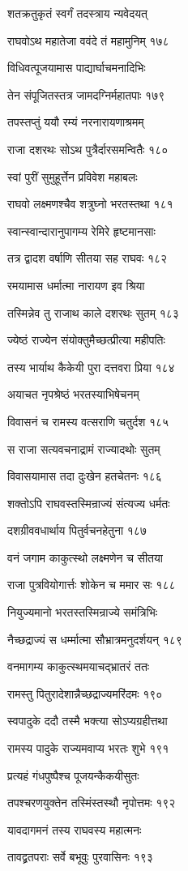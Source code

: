 शतक्रतुकृतं स्वर्गं तदस्त्राय न्यवेदयत्

राघवोऽथ महातेजा ववंदे तं महामुनिम् १७८

विधिवत्पूजयामास पाद्यार्घाचमनादिभिः

तेन संपूजितस्तत्र जामदग्निर्महातपाः १७९

तपस्तप्तुं ययौ रम्यं नरनारायणाश्रमम्

राजा दशरथः सोऽथ पुत्रैर्दारसमन्वितैः १८०

स्वां पुरीं सुमुहूर्त्तेन प्रविवेश महाबलः

राघवो लक्ष्मणश्चैव शत्रुघ्नो भरतस्तथा १८१

स्वान्स्वान्दारानुपागम्य रेमिरे हृष्टमानसाः

तत्र द्वादश वर्षाणि सीतया सह राघवः १८२

रमयामास धर्मात्मा नारायण इव श्रिया

तस्मिन्नेव तु राजाथ काले दशरथः सुतम् १८३

ज्येष्ठं राज्येन संयोक्तुमैच्छत्प्रीत्या महीपतिः

तस्य भार्याथ कैकेयी पुरा दत्तवरा प्रिया १८४

अयाचत नृपश्रेष्ठं भरतस्याभिषेचनम्

विवासनं च रामस्य वत्सराणि चतुर्दश १८५

स राजा सत्यवचनाद्रामं राज्यादथोः सुतम्

विवासयामास तदा दुःखेन हतचेतनः १८६

शक्तोऽपि राघवस्तस्मिन्राज्यं संत्यज्य धर्मतः

दशग्रीववधार्थाय पितुर्वचनहेतुना १८७

वनं जगाम काकुत्स्थो लक्ष्मणेन च सीतया

राजा पुत्रवियोगार्त्तः शोकेन च ममार सः १८८

नियुज्यमानो भरतस्तस्मिन्राज्ये समंत्रिभिः

नैच्छद्राज्यं स धर्म्मात्मा सौभ्रात्रमनुदर्शयन् १८९

वनमागम्य काकुत्स्थमयाचद्भ्रातरं ततः

रामस्तु पितुरादेशान्नैच्छद्राज्यमरिंदमः १९०

स्वपादुके ददौ तस्मै भक्त्या सोऽप्यग्रहीत्तथा

रामस्य पादुके राज्यमवाप्य भरतः शुभे १९१

प्रत्यहं गंधपुष्पैश्च पूजयन्कैकयीसुतः

तपश्चरणयुक्तेन तस्मिंस्तस्थौ नृपोत्तमः १९२

यावदागमनं तस्य राघवस्य महात्मनः

तावद्व्रतपराः सर्वे बभूवुः पुरवासिनः १९३

